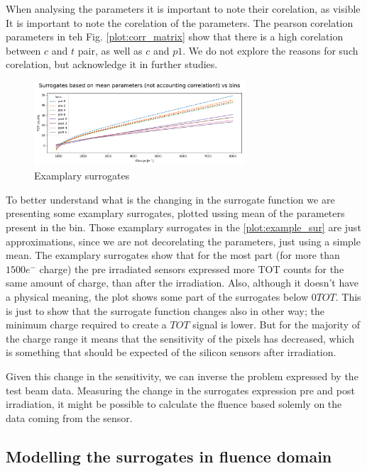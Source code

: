 When analysing the parameters it is important to note their corelation, as visible
It is important to note the corelation of the parameters.
The pearson corelation parameters in teh Fig. \ref{plot:corr_matrix} show that there is a high corelation between $c$ and $t$ pair, as well as $c$ and $p1$.
We do not explore the reasons for such corelation, but acknowledge it in further studies.


\begin{figure}[H]
\centering
\includegraphics[width=0.7\textwidth]{figures/chapter4/surrogates/p2_bins_surrogates.png}
\caption{Examplary surrogates}
\label{fig:example_sur}
\end{figure}

To better understand what is the changing in the surrogate function we are presenting some examplary surrogates, plotted ussing mean of the parameters present in the bin.
Those examplary surrogates in the \ref{plot:example_sur} are just approximations, since we are not decorelating the parameters, just using a simple mean.
The examplary surrogates show that for the most part (for more than $1500 e^{-}$ charge) the pre irradiated sensors expressed more TOT counts for the same amount of charge, than after the irradiation.
Also, although it doesn't have a physical meaning, the plot shows some part of the surrogates below $0 TOT$.
This is just to show that the surrogate function changes also in other way; the minimum charge required to create a $TOT$ signal is lower.
But for the majority of the charge range it means that the sensitivity of the pixels has decreased, which is something that should be expected of the silicon sensors after irradiation.

Given this change in the sensitivity, we can inverse the problem expressed by the test beam data.
Measuring the change in the surrogates expression pre and post irradiation, it might be possible to calculate the fluence based solemly on the data coming from the sensor.

\subsection{Modelling the surrogates in fluence domain}

